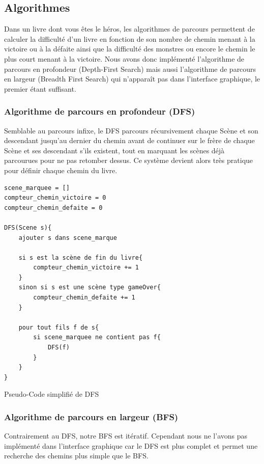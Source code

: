 \documentclass[12pt]{article}
\begin{document}
\subsection{Algorithmes}
Dans un livre dont vous êtes le héros, les algorithmes de parcours permettent de calculer la difficulté d'un livre en fonction de son nombre de chemin menant à la victoire ou à la défaite ainsi que la difficulté des monstres ou encore le chemin le plus court menant à la victoire. Nous avons donc implémenté l'algorithme de parcours en profondeur (Depth-First Search) mais aussi l'algorithme de parcours en largeur (Breadth First Search) qui n'apparaît pas dans l'interface graphique, le premier étant suffisant.

\subsubsection{Algorithme de parcours en profondeur (DFS)}
Semblable au parcours infixe, le DFS parcours récursivement chaque Scène et son descendant jusqu'au dernier du chemin avant de continuer sur le frère de chaque Scène et ses descendant s'ils existent, tout en marquant les scènes déjà parcourues pour ne pas retomber dessus. Ce système devient alors très pratique pour définir chaque chemin du livre.
\begin{listing}[H]
\begin{verbatim}
scene_marquee = []
compteur_chemin_victoire = 0
compteur_chemin_defaite = 0

DFS(Scene s){ 
    ajouter s dans scene_marque

    si s est la scène de fin du livre{
        compteur_chemin_victoire += 1
    }
    sinon si s est une scène type gameOver{
        compteur_chemin_defaite += 1
    }
    
    pour tout fils f de s{
        si scene_marquee ne contient pas f{
            DFS(f)
        }
    }
}
\end{verbatim}
\caption{Pseudo-Code simplifié de DFS}
\end{listing}

\subsubsection{Algorithme de parcours en largeur (BFS)}
Contrairement au DFS, notre BFS est itératif. Cependant nous ne l'avons pas implémenté dans l'interface graphique car le DFS est plus complet et permet une recherche des chemins plus simple que le BFS.
\end{document}
